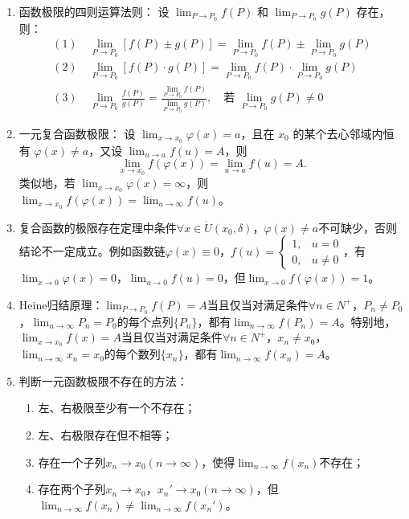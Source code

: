 \documentclass[UTF8]{ctexart}
\theoremstyle{remark}
\begin{document}
\begin{enumerate}
			\item 函数极限的四则运算法则：
			设 $\lim_{P \to P_0} f(P)$ 和 $\lim_{P \to P_0} g(P)$ 存在，则：
			\begin{align*}
				(1)\ & \lim_{P \to P_0} [f(P) \pm g(P)] = \lim_{P \to P_0} f(P) \pm \lim_{P \to P_0} g(P) \\
				(2)\ & \lim_{P \to P_0} [f(P) \cdot g(P)] = \lim_{P \to P_0} f(P) \cdot \lim_{P \to P_0} g(P) \\
				(3)\ & \lim_{P \to P_0} \frac{f(P)}{g(P)} = \frac{\lim_{P \to P_0} f(P)}{\lim_{P \to P_0} g(P)}, \quad \text{若 } \lim_{P \to P_0} g(P) \ne 0
			\end{align*}
			
			\item 一元复合函数极限：
			设 $\lim_{x \to x_0} \varphi(x) = a$，且在 $ x_0 $ 的某个去心邻域内恒有 $ \varphi(x) \ne a $，又设 $\lim_{u \to a} f(u) = A$，则
			$$
			\lim_{x \to x_0} f(\varphi(x)) = \lim_{u \to a} f(u) = A.
			$$
			类似地，若 $\lim_{x \to x_0} \varphi(x) = \infty$，则 $\lim_{x \to x_0} f(\varphi(x)) = \lim_{u \to \infty} f(u)$。
			\item 复合函数的极限存在定理中条件$\forall x \in \dot{U}(x_{0}, \delta)$，$\varphi(x) \neq a$不可缺少，否则结论不一定成立。例如函数链$\varphi(x) \equiv 0$，$f(u)= \begin{cases}1, & u=0 \\ 0, & u \neq 0\end{cases}$，有$\lim _{x \to 0} \varphi(x)=0$，$\lim _{u \to 0} f(u)=0$，但$\lim _{x \to 0} f(\varphi(x))=1$。
			
			\item Heine归结原理：$\lim _{P \to P_{0}} f(P)=A$当且仅当对满足条件$\forall n \in N^{+}$，$P_{n} \neq P_{0}$，$\lim _{n \to \infty} P_{n}=P_{0}$的每个点列$\{P_{n}\}$，都有$\lim _{n \to \infty} f(P_{n})=A$。特别地，$\lim _{x \to x_{0}} f(x)=A$当且仅当对满足条件$\forall n \in N^{+}$，$x_{n} \neq x_{0}$，$\lim _{n \to \infty} x_{n}=x_{0}$的每个数列$\{x_{n}\}$，都有$\lim _{n \to \infty} f(x_{n})=A$。
			
			\item 判断一元函数极限不存在的方法：
			\begin{enumerate}
				\item 左、右极限至少有一个不存在；
				\item 左、右极限存在但不相等；
				\item 存在一个子列$x_{n} \to x_{0}(n \to \infty)$，使得$\lim _{n \to \infty} f(x_{n})$不存在；
				\item 存在两个子列$x_{n} \to x_{0}$，$x_{n}' \to x_{0}(n \to \infty)$，但$\lim _{n \to \infty} f(x_{n}) \neq \lim _{n \to \infty} f(x_{n}')$。
			\end{enumerate}
			

\end{enumerate}
\end{document}
